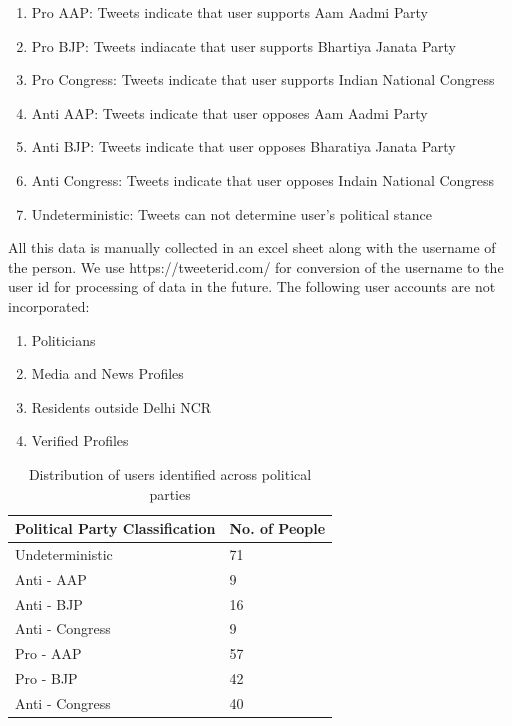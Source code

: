 \documentclass[a4paper,11pt]{article}
\begin{document}
\begin{enumerate}
    \item Pro AAP: Tweets indicate that user supports Aam Aadmi Party
    \item Pro BJP: Tweets indiacate that user supports Bhartiya Janata Party
    \item Pro Congress: Tweets indicate that user supports Indian National Congress
    \item Anti AAP: Tweets indicate that user opposes Aam Aadmi Party
    \item Anti BJP: Tweets indicate that user opposes Bharatiya Janata Party
    \item Anti Congress: Tweets indicate that user opposes Indain National Congress
    \item Undeterministic: Tweets can not determine user's political stance
\end{enumerate}
All this data is manually collected in an excel sheet along with the username of the person. We use https://tweeterid.com/ for conversion of the username to the user id for processing of data in the future. The following user accounts are not incorporated:
\begin{enumerate}
    \item Politicians
    \item Media and News Profiles
    \item Residents outside Delhi NCR
    \item Verified Profiles
\end{enumerate}

\begin{table}[!htbp]
\centering
\caption{Distribution of users identified across political parties} 
\begin{tabular}{|p{10cm}|p{2cm}|} 
\hline
 Political Party Classification & No. of People \\
 \hline \hline
 Undeterministic & 71 \\ 
 \hline
 Anti - AAP & 9 \\
\hline
 Anti - BJP & 16 \\
\hline
Anti - Congress & 9 \\
\hline
Pro - AAP & 57 \\
\hline
Pro - BJP & 42 \\
\hline
Anti - Congress & 40 \\
\hline
\end{tabular}
\label{tab:partyDistribution}
\end{table} 
\end{document}
